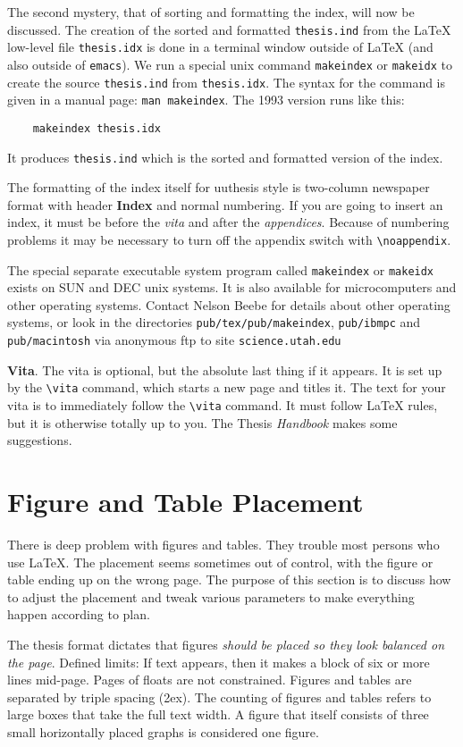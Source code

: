 The second mystery, that of sorting and formatting the index, will now
be discussed. The creation of the sorted and formatted {\tt thesis.ind}
from the \LaTeX{} low-level file {\tt thesis.idx} is done in a terminal
window outside of \LaTeX{} (and also outside of {\tt emacs}). We run a
special unix command {\tt makeindex} or {\tt makeidx} to create the
source {\tt thesis.ind} from {\tt thesis.idx}. The syntax for the
command is given in a manual page: {\tt man makeindex}. The 1993 version
runs like this:

\verb"    makeindex thesis.idx"

It produces \verb"thesis.ind" which is the sorted and formatted version
of the index.

The formatting of the index itself for uuthesis style is two-column
newspaper format with header {\bf Index} and normal numbering. If you
are going to insert an index, it must be before the {\em vita} and after
the {\em appendices}. Because of numbering problems it may be necessary
to turn off the appendix switch with \verb"\noappendix".

The special separate executable system program called {\tt makeindex} or
{\tt makeidx} exists on SUN and DEC unix systems. It is also available
for microcomputers and other operating systems. Contact Nelson Beebe
for details about other operating systems, or look in the
directories {\tt pub/tex/pub/makeindex}, {\tt pub/ibmpc} and {\tt
pub/macintosh} via anonymous ftp to site {\tt science.utah.edu}

{\bf Vita}. The vita is optional, but the absolute last thing if it
appears. It is set up by the \verb|\vita| command, which starts a new
page and titles it. The text for your vita is to immediately follow the
\verb|\vita| command. It must follow \LaTeX{} rules, but it is otherwise
totally up to you. The Thesis {\em Handbook} makes some suggestions.

\section{Figure and Table Placement}

There is deep problem with figures and tables. They trouble most persons
who use \LaTeX{}. The placement seems sometimes out of control, with the
figure or table ending up on the wrong page. The purpose of this section
is to discuss how to adjust the placement and tweak various parameters
to make everything happen according to plan.

The thesis format dictates that figures {\em should be placed so they
look balanced on the page}. Defined limits: If text appears, then it
makes a block of six or more lines mid-page. Pages of floats are not
constrained. Figures and tables are separated by triple spacing (2ex).
The counting of figures and tables refers to large boxes that take the
full text width. A figure that itself consists of three small
horizontally placed graphs is considered one figure.

